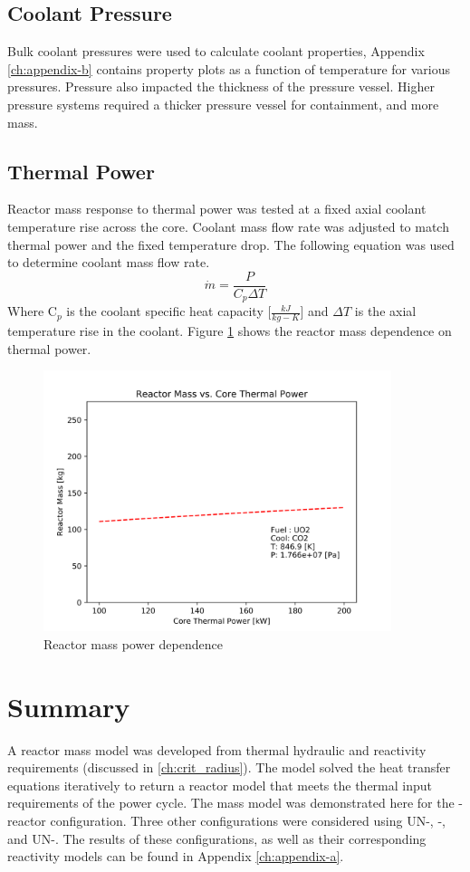 \subsection{Coolant Pressure}
Bulk coolant pressures were used to calculate coolant properties, Appendix
\ref{ch:appendix-b} contains property plots as a function of temperature for
various pressures. Pressure also impacted the thickness of the pressure vessel.
Higher pressure systems required a thicker pressure vessel for containment, and more mass.

\subsection{Thermal Power}
Reactor mass response to thermal power was tested at a fixed axial coolant temperature
rise across the core. Coolant mass flow rate was adjusted to match thermal power
and the fixed temperature drop. The following equation was used to determine
coolant mass flow rate.
\begin{equation}
    \dot{m} = \frac{P}{C_p \Delta T}
\end{equation}
Where C$_p$ is the coolant specific heat capacity [$\frac{kJ}{kg-K}$] and
$\Delta T$ is the axial temperature rise in the coolant.
Figure \ref{fig:mass_vs_q_uo2_co2} shows the reactor mass dependence on thermal
power.

\begin{figure}[h]
    \centering
    \includegraphics[width=4in]{../images/mass_vs_q_uo2_co2.png}
\caption{Reactor mass power dependence}
\label{fig:mass_vs_q_uo2_co2}
\end{figure}

\section{Summary}
A reactor mass model was developed from thermal hydraulic and reactivity
requirements (discussed in \ref{ch:crit_radius}). The model solved the heat
transfer equations iteratively to return a reactor model that meets the thermal
input requirements of the power cycle. The mass model was demonstrated here for
the \uox-\codiox  reactor configuration. Three other configurations were
considered using UN-\codiox, \uox-\water, and UN-\water. The results of these
configurations, as well as their corresponding reactivity models can be found in
Appendix \ref{ch:appendix-a}.

